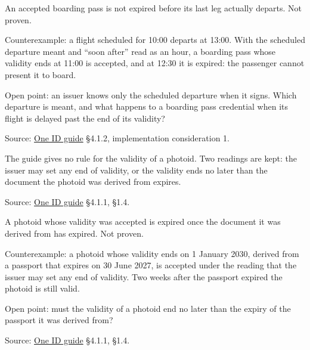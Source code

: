 \begin{theorem}
  \label{thm:valid-until-actual-departure}
  An accepted boarding pass is not expired before its last leg actually
  departs.  Not proven.

  Counterexample: a flight scheduled for 10:00 departs at 13:00.  With the
  scheduled departure meant and ``soon after'' read as an hour, a boarding
  pass whose validity ends at 11:00 is accepted, and at 12:30 it is expired:
  the passenger cannot present it to board.

  Open point: an issuer knows only the scheduled departure when it signs.
  Which departure is meant, and what happens to a boarding pass credential
  when its flight is delayed past the end of its validity?

  Source: \href{https://standards.atlassian.net/wiki/spaces/OneID/pages/2947416082/Technical+Implementation+Guide}{One ID guide} §4.1.2, implementation consideration 1.
\end{theorem}

\begin{definition}
  \label{def:photoid-validity}
  The guide gives no rule for the validity of a photoid.  Two readings are
  kept: the issuer may set any end of validity, or the validity ends no later
  than the document the photoid was derived from expires.

  Source: \href{https://standards.atlassian.net/wiki/spaces/OneID/pages/2947416082/Technical+Implementation+Guide}{One ID guide} §4.1.1, §1.4.
\end{definition}

\begin{theorem}
  \label{thm:photoid-expires-with-document}
  A photoid whose validity was accepted is expired once the document it was
  derived from has expired.  Not proven.

  Counterexample: a photoid whose validity ends on 1 January 2030, derived
  from a passport that expires on 30 June 2027, is accepted under the reading
  that the issuer may set any end of validity.  Two weeks after the passport
  expired the photoid is still valid.

  Open point: must the validity of a photoid end no later than the expiry of
  the passport it was derived from?

  Source: \href{https://standards.atlassian.net/wiki/spaces/OneID/pages/2947416082/Technical+Implementation+Guide}{One ID guide} §4.1.1, §1.4.
\end{theorem}

